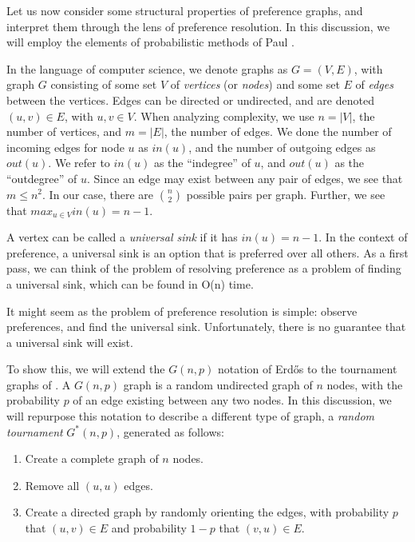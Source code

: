 Let us now consider some structural properties of preference graphs, and interpret them through the lens of preference resolution.
In this discussion, we will employ the elements of probabilistic methods of Paul \cite{erdos:1959}.

\bigskip

In the language of computer science, we denote graphs as $G = (V, E)$, with graph $G$ consisting of some set $V$ of \textit{vertices} (or \textit{nodes}) and some set $E$ of \textit{edges} between the vertices.
Edges can be directed or undirected, and are denoted $(u,v) \in E$, with $u, v \in V$.
When analyzing complexity, we use $n = |V|$, the number of vertices, and $m = |E|$, the number of edges.
We done the number of incoming edges for node $u$ as $in(u)$, and the number of outgoing edges as $out(u)$.
We refer to $in(u)$ as the ``indegree'' of $u$, and $out(u)$ as the ``outdegree'' of $u$.
Since an edge may exist between any pair of edges, we see that $m \leq n^2$.
In our case, there are ${n}\choose{2}$ possible pairs per graph.
Further, we see that $max_{u \in V}in(u) = n - 1$.

A vertex can be called a \textit{universal sink} if it has $in(u) = n - 1$.
In the context of preference, a universal sink is an option that is preferred over all others.
As a first pass, we can think of the problem of resolving preference as a problem of finding a universal sink, which can be found in O(n) time.

It might seem as the problem of preference resolution is simple: observe preferences, and find the universal sink.
Unfortunately, there is no guarantee that a universal sink will exist.

\bigskip

To show this, we will extend the $G(n,p)$ notation of Erd{\H o}s to the tournament graphs of \cite{landau:1953}.
A $G(n,p)$ graph is a random undirected graph of $n$ nodes, with the probability $p$ of an edge existing between any two nodes.
In this discussion, we will repurpose this notation to describe a different type of graph, a \textit{random tournament} $G^*(n,p)$, generated as follows:

\begin{enumerate}
	\item Create a complete graph of $n$ nodes.
	\item Remove all $(u,u)$ edges.
	\item Create a directed graph by randomly orienting the edges, with probability $p$ that $(u, v) \in E$ and probability $1-p$ that $(v, u) \in E$.
\end{enumerate}

